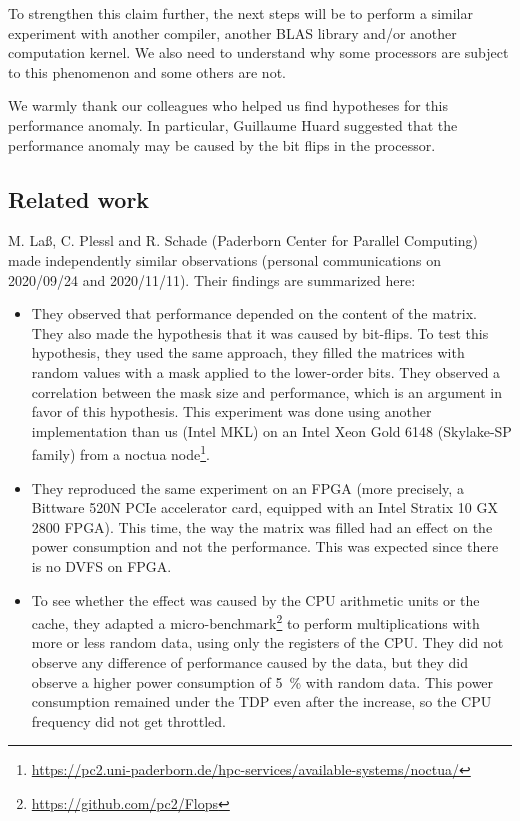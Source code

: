             To strengthen this claim further, the next steps will be to perform a similar experiment with another
            compiler, another BLAS library and/or another computation kernel. We also need to understand why some
            processors are subject to this phenomenon and some others are not.

            We warmly thank our colleagues who helped us find hypotheses for this performance anomaly. In
            particular, Guillaume Huard suggested that the performance anomaly may be caused by the bit flips in the
            processor.

        \subsection{Related work}%
            M. La{\ss}, C. Plessl and R. Schade (Paderborn Center for Parallel Computing) made independently similar
            observations (personal communications on 2020/09/24 and 2020/11/11). Their findings are summarized here:
            \begin{itemize}
                \item They observed that \dgemm performance depended on the content of the matrix. They also
                    made the hypothesis that it was caused by bit-flips. To test this hypothesis, they used the same
                    approach, they filled the matrices with random values with a mask applied to the lower-order bits.
                    They observed a correlation between the mask size and \dgemm performance, which is an
                    argument in favor of this hypothesis. This experiment was done using another \dgemm
                    implementation than us (Intel MKL) on an Intel Xeon Gold 6148 (Skylake-SP family) from a noctua
                    node\footnote{\url{https://pc2.uni-paderborn.de/hpc-services/available-systems/noctua/}}.
                \item They reproduced the same experiment on an FPGA (more precisely, a Bittware 520N PCIe accelerator
                    card, equipped with an Intel Stratix 10 GX 2800 FPGA). This time, the way the matrix was filled had
                    an effect on the power consumption and not the performance. This was expected since there is no DVFS
                    on FPGA.
                \item To see whether the effect was caused by the CPU arithmetic units or the cache, they adapted a
                    micro-benchmark\footnote{\url{https://github.com/pc2/Flops}} to perform multiplications with more or
                    less random data, using only the registers of the CPU. They did not observe any difference of
                    performance caused by the data, but they did observe a higher power consumption of \SI{5}{\percent}
                    with random data. This power consumption remained under the TDP even after the increase, so the CPU
                    frequency did not get throttled.
            \end{itemize}

